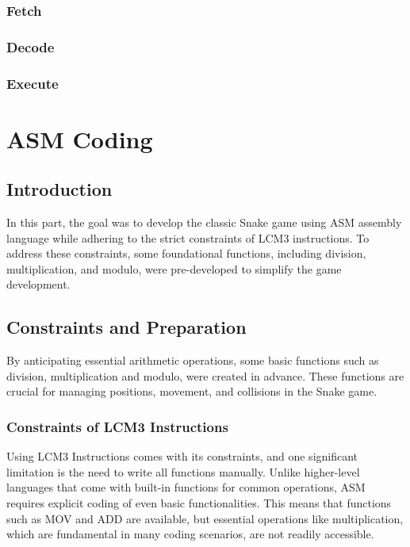 \documentclass{article}
\begin{document}
\subsubsection{Fetch}
\subsubsection{Decode}
\subsubsection{Execute}
















\newpage
\section{ASM Coding}
\subsection{Introduction}
In this part, the goal was to develop the classic Snake game using ASM assembly language while adhering to the strict constraints of LCM3 instructions. To address these constraints, some foundational functions, including division, multiplication, and modulo, were pre-developed to simplify the game development.

\subsection{Constraints and Preparation}
 By anticipating essential arithmetic operations, some basic functions such as division, multiplication and modulo, were created in advance. These functions are crucial for managing positions, movement, and collisions in the Snake game.

\subsubsection{Constraints of LCM3 Instructions}

Using LCM3 Instructions comes with its constraints, and one significant limitation is the need to write all functions manually. Unlike higher-level languages that come with built-in functions for common operations, ASM requires explicit coding of even basic functionalities. This means that functions such as MOV and ADD are available, but essential operations like multiplication, which are fundamental in many coding scenarios, are not readily accessible.
\end{document}
